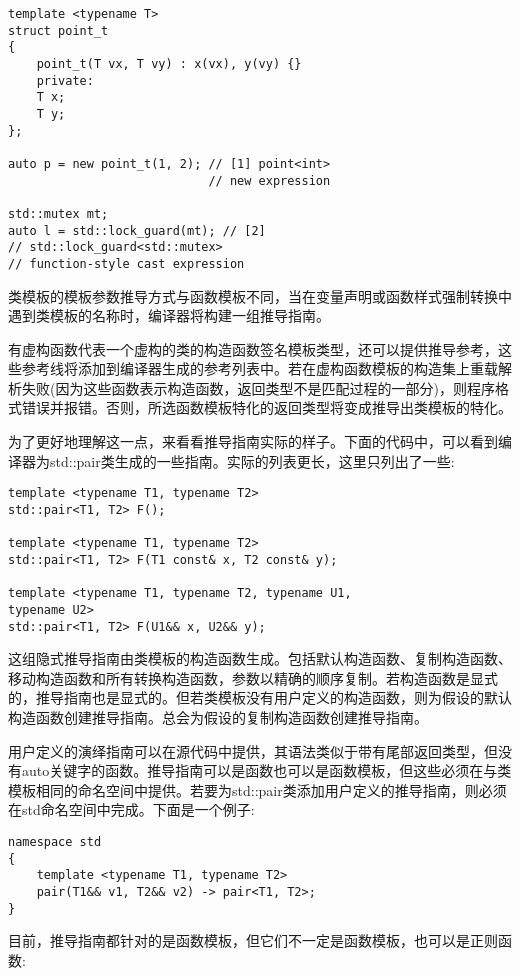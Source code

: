 \begin{lstlisting}[style=styleCXX]
template <typename T>
struct point_t
{
	point_t(T vx, T vy) : x(vx), y(vy) {}
	private:
	T x;
	T y;
};

auto p = new point_t(1, 2); // [1] point<int>
							// new expression
							
std::mutex mt;
auto l = std::lock_guard(mt); // [2]
// std::lock_guard<std::mutex>
// function-style cast expression
\end{lstlisting}

类模板的模板参数推导方式与函数模板不同，当在变量声明或函数样式强制转换中遇到类模板的名称时，编译器将构建一组推导指南。

有虚构函数代表一个虚构的类的构造函数签名模板类型，还可以提供推导参考，这些参考线将添加到编译器生成的参考列表中。若在虚构函数模板的构造集上重载解析失败(因为这些函数表示构造函数，返回类型不是匹配过程的一部分)，则程序格式错误并报错。否则，所选函数模板特化的返回类型将变成推导出类模板的特化。

为了更好地理解这一点，来看看推导指南实际的样子。下面的代码中，可以看到编译器为std::pair类生成的一些指南。实际的列表更长，这里只列出了一些:

\begin{lstlisting}[style=styleCXX]
template <typename T1, typename T2>
std::pair<T1, T2> F();

template <typename T1, typename T2>
std::pair<T1, T2> F(T1 const& x, T2 const& y);

template <typename T1, typename T2, typename U1,
typename U2>
std::pair<T1, T2> F(U1&& x, U2&& y);
\end{lstlisting}

这组隐式推导指南由类模板的构造函数生成。包括默认构造函数、复制构造函数、移动构造函数和所有转换构造函数，参数以精确的顺序复制。若构造函数是显式的，推导指南也是显式的。但若类模板没有用户定义的构造函数，则为假设的默认构造函数创建推导指南。总会为假设的复制构造函数创建推导指南。

用户定义的演绎指南可以在源代码中提供，其语法类似于带有尾部返回类型，但没有auto关键字的函数。推导指南可以是函数也可以是函数模板，但这些必须在与类模板相同的命名空间中提供。若要为std::pair类添加用户定义的推导指南，则必须在std命名空间中完成。下面是一个例子:

\begin{lstlisting}[style=styleCXX]
namespace std
{
	template <typename T1, typename T2>
	pair(T1&& v1, T2&& v2) -> pair<T1, T2>;
}
\end{lstlisting}

目前，推导指南都针对的是函数模板，但它们不一定是函数模板，也可以是正则函数:


